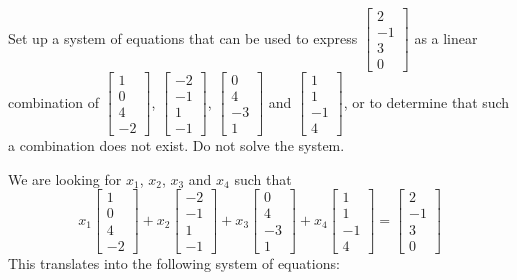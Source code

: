 \documentclass{ximera}
\begin{document}
\begin{example}\label{ex:lincombalgebra2}
Set up a system of equations that can be used to express $\begin{bmatrix}2\\-1\\3\\0\end{bmatrix}$ as a linear combination of $\begin{bmatrix}1\\0\\4\\-2\end{bmatrix}$, $\begin{bmatrix}-2\\-1\\1\\-1\end{bmatrix}$, $\begin{bmatrix}0\\4\\-3\\1\end{bmatrix}$ and $\begin{bmatrix}1\\1\\-1\\4\end{bmatrix}$, or to determine that such a combination does not exist.  Do not solve the system.
\begin{explanation}
We are looking for $x_1$, $x_2$, $x_3$ and $x_4$ such that 
$$x_1\begin{bmatrix}1\\0\\4\\-2\end{bmatrix}+x_2\begin{bmatrix}-2\\-1\\1\\-1\end{bmatrix}+x_3\begin{bmatrix}0\\4\\-3\\1\end{bmatrix}+x_4\begin{bmatrix}1\\1\\-1\\4\end{bmatrix}=\begin{bmatrix}2\\-1\\3\\0\end{bmatrix}$$
This translates into the following system of equations:


\end{explanation}
\end{example}
\end{document}
